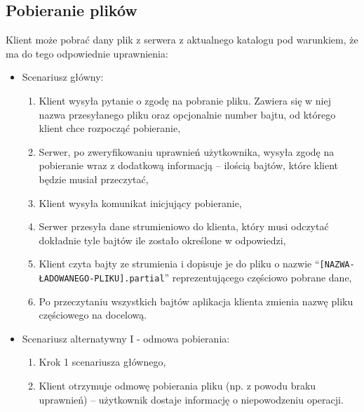 \documentclass[8pt,a4paper]{article}
\newcommand{\quotes}[1]{``#1''}
\newcommand{\quotcode}[1]{\quotes{\texttt{#1}}}
\begin{document}
\subsection{Pobieranie plików}
\noindent Klient może pobrać dany plik z serwera z aktualnego katalogu pod warunkiem, że ma do tego odpowiednie uprawnienia:
\begin{itemize}
    \item Scenariusz główny:
    \begin{enumerate}
        \item Klient wysyła pytanie o zgodę na pobranie pliku. Zawiera się w niej nazwa przesyłanego pliku oraz opcjonalnie number bajtu, od którego klient chce rozpocząć pobieranie,
        \item Serwer, po zweryfikowaniu uprawnień użytkownika, wysyła zgodę na pobieranie wraz z dodatkową informacją -- ilością bajtów, które klient będzie musiał przeczytać,
        \item Klient wysyła komunikat inicjujący pobieranie,
        \item Serwer przesyła dane strumieniowo do klienta, który musi odczytać dokładnie tyle bajtów ile zostało określone w odpowiedzi,
        \item Klient czyta bajty ze strumienia i dopisuje je do pliku o nazwie \quotcode{[NAZWA-ŁADOWANEGO-PLIKU].partial} reprezentującego częściowo pobrane dane,
        \item Po przeczytaniu wszystkich bajtów aplikacja klienta zmienia nazwę pliku częściowego na docelową.
    \end{enumerate}

    \item Scenariusz alternatywny I - odmowa pobierania:
    \begin{enumerate}
        \item Krok 1 scenariusza głównego,
        \item Klient otrzymuje odmowę pobierania pliku (np. z powodu braku uprawnień) -- użytkownik dostaje informację o niepowodzeniu operacji.
    \end{enumerate}


\end{itemize}
\end{document}
